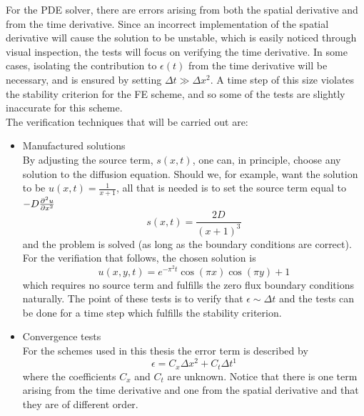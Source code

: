 \noindent For the PDE solver, there are errors arising from both the spatial derivative and from the time derivative. 
Since an incorrect implementation of the spatial derivative will cause the solution to be unstable, which is easily noticed through visual inspection, the tests will focus on verifying the time derivative. 
In some cases, isolating the contribution to $\epsilon(t)$ from the time derivative will be necessary, and is ensured by setting $\Delta t \gg\Delta x^2$. 
A time step of this size violates the stability criterion for the FE scheme, and so some of the tests are slightly inaccurate for this scheme. \\

The verification techniques that will be carried out are:

\begin{itemize}
 \item Manufactured solutions\\
 By adjusting the source term, $s(x,t)$, one can, in principle, choose any solution to the diffusion equation. 
Should we, for example, want the solution to be $u(x,t) = \frac{1}{x+1}$, all that is needed is to set the source term equal to $-D\frac{\partial^2 u}{\partial x^2}$
\begin{equation*}
s(x,t) = \frac{2D}{(x+1)^3}
\end{equation*}
and the problem is solved (as long as the boundary conditions are correct).
 For the verifiation that follows, the chosen solution is
 \begin{equation}\label{manufactured_solution}
  u(x,y,t) = e^{-\pi^2t}\cos(\pi x)\cos(\pi y) +1
 \end{equation}
 which requires no source term and fulfills the zero flux boundary conditions naturally. 
  The point of these tests is to verify that $\epsilon \sim \Delta t$ and the tests can be done for a time step which fulfills the stability criterion.
  \item Convergence tests \\
 For the schemes used in this thesis the error term is described by
\begin{equation}\label{analysis:error}
 \epsilon = C_x\Delta x^2 + C_t\Delta t^1
\end{equation}
where the coefficients $C_x$ and $C_t$ are unknown. 
Notice that there is one term arising from the time derivative and one from the spatial derivative and that they are of different order. \\

\end{itemize}
